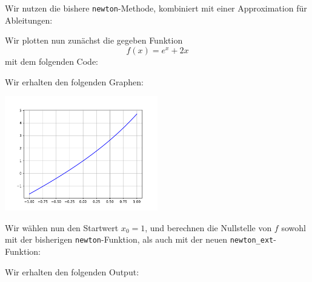 \section{}

Wir nutzen die bishere \texttt{newton}-Methode, kombiniert mit einer Approximation für Ableitungen:



Wir plotten nun zunächst die gegeben Funktion
\[
  f(x) = e^x + 2x
\]
mit dem folgenden Code:



Wir erhalten den folgenden Graphen:

\begin{center}
  \includegraphics[width = 0.5\textwidth]{chapter_04/exercise_04_14_figure.pdf}
\end{center}

Wir wählen nun den Startwert $x_0 = 1$, und berechnen die Nullstelle von $f$ sowohl mit der bisherigen \texttt{newton}-Funktion, als auch mit der neuen \texttt{newton\_ext}-Funktion:



Wir erhalten den folgenden Output:

